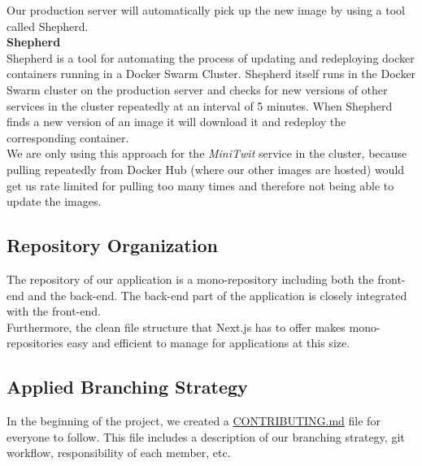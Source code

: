 \documentclass{article}
\begin{document}
Our production server will automatically pick up the new image by using a tool called Shepherd.\\

\noindent
\textbf{Shepherd}\\
Shepherd is a tool for automating the process of updating and redeploying docker containers running in a Docker Swarm Cluster. Shepherd itself runs in the Docker Swarm cluster on the production server and checks for new versions of other services in the cluster repeatedly at an interval of 5 minutes. When Shepherd finds a new version of an image it will download it and redeploy the corresponding container.\\

We are only using this approach for the \textit{MiniTwit} service in the cluster, because pulling repeatedly from Docker Hub (where our other images are hosted) would get us rate limited for pulling too many times and therefore not being able to update the images.

    
\subsection{Repository Organization}
The repository of our application is a mono-repository including both the front-end and the back-end. The back-end part of the application is closely integrated with the front-end.\\

Furthermore, the clean file structure that Next.js has to offer makes mono-repositories easy and efficient to manage for applications at this size.

\subsection{Applied Branching Strategy}
In the beginning of the project, we created a \href{https://github.com/AlexBMJ/minitwit/blob/main/CONTRIBUTING.md}{CONTRIBUTING.md} file for everyone to follow. This file includes a description of our branching strategy, git workflow, responsibility of each member, etc. 
\end{document}
